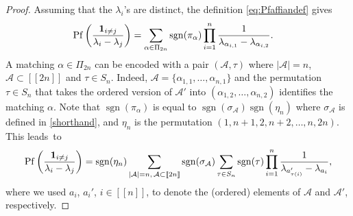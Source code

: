 \documentclass[pdftex]{sigma}
\numberwithin{equation}{section}
\theoremstyle{definition}
\newcommand{\ind}{{\bf{1}}}
\newcommand{\sgn}{\operatorname{sgn}}
\newcommand{\Pf}{\operatorname{Pf}}
\newcommand{\cA}{\mathcal{A}}
\newcommand{\lst}[1]{[\![#1 ]\!]}
\begin{document}
\begin{proof} Assuming that the $\lambda_i$'s are distinct, the definition \eqref{eq:Pfaffiandef} gives
\begin{align*}
 \Pf\left(\frac{\ind_{i\neq j}}{\lambda_i-\lambda_j}\right)&
 =\sum_{\alpha\in \Pi_{2n}} \sgn(\pi_\alpha) \prod_{i=1}^n \frac{1}{\lambda_{\alpha_{i,1}}-\lambda_{\alpha_{i,2}}}.
\end{align*}
A matching $\alpha \in \Pi_{2n}$ can be encoded with a pair $(\cA, \tau)$ where $|\cA|=n$, $\cA\subset \lst{2n}$ and $\tau\in S_n$. Indeed, $\cA=\{\alpha_{1,1}, \dots, \alpha_{n,1}\}$ and the permutation $\tau\in S_n$ that takes the ordered version of $\cA'$ into $(\alpha_{1,2}, \dots, \alpha_{n,2})$ identifies the matching $\alpha$. Note that $\sgn(\pi_\alpha)$ is equal to $\sgn(\sigma_{\cA} )\sgn(\eta_n)$ where $\sigma_{\cA}$ is defined in \eqref{shorthand}, and $\eta_n$ is the permutation $(1,n+1,2, n+2, \dots, n, 2n)$. This leads~to
\begin{align}
 \label{eq:Pf4_2}
\Pf\left(\frac{\ind_{i\neq j}}{\lambda_i-\lambda_j}\right)=\sgn(\eta_n) \sum_{|\cA|=n,\, \cA\subset \lst{2n}} \sgn(\sigma_{\cA}) \sum_{\tau\in S_n} \sgn(\tau) \prod_{i=1}^n \frac{1}{\lambda_{a'_{\tau(i)}}-\lambda_{a_i}},
\end{align}
where we used $a_i$, $a_i'$, $i\in \lst{n}$, to denote the (ordered) elements of $\cA$ and $ \cA'$, respectively.


\end{proof}
\end{document}
